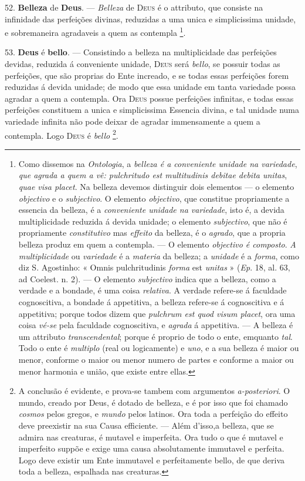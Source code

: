 52. \textbf{Belleza} de \textbf{Deus}. --- \emph{Belleza} de \textsc{Deus} é o attributo, que consiste na infinidade das perfeições divinas, reduzidas a uma unica e simplicissima unidade, e sobremaneira agradaveis a quem as contempla \footnote{Como dissemos na \emph{Ontologia}, a \emph{belleza é a conveniente unidade na variedade}, \emph{que agrada a quem a vê: pulchritudo est multitudinis debitae debita unitas}, \emph{quae visa placet}. Na belleza devemos distinguir dois elementos --- o elemento \emph{objectivo} e o \emph{subjectivo}. O elemento \emph{objectivo}, que constitue propriamente a essencia da belleza, é a \emph{conveniente unidade na variedade}, isto é, a devida multiplicidade reduzida á devida unidade; o elemento \emph{subjectivo}, que não é propriamente \emph{constitutivo} mas \emph{effeito} da belleza, é o \emph{agrado}, que a propria belleza produz em quem a contempla. --- O elemento \emph{objectivo é composto}. \emph{A multiplicidade} ou \emph{variedade} é a \emph{materia} da belleza; a \emph{unidade} é a \emph{forma}, como diz S. Agostinho: « Omnis pulchritudinis \emph{forma} est \emph{unitas} » (\emph{Ep}. 18, al. 63, ad Coelest. n. 2). --- O elemento \emph{subjectivo} indica que a belleza, como a verdade e a bondade, é uma coisa \emph{relativa}. A verdade refere-se á faculdade cognoscitiva, a bondade á appetitiva, a belleza refere-se á cognoscitiva e á appetitiva; porque todos dizem que \emph{pulchrum est quod visum placet}, ora uma coisa \emph{vé-se} pela faculdade cognoscitiva, e \emph{agrada} á appetitiva. --- A belleza é um attributo \emph{transcendental}; porque é proprio de todo o ente, emquanto \emph{tal}. Todo o ente é \emph{multiplo} (real ou logicamente) e \emph{uno}, e a sua belleza é maior ou menor, conforme o maior ou menor numero de partes e conforme a maior ou menor harmonia e união, que existe entre ellas.}.

53. \textbf{Deus} é \textbf{bello}. --- Consistindo a belleza na multiplicidade das perfeições devidas, reduzida á conveniente unidade, \textsc{Deus} será \emph{bello}, se possuir todas as perfeições, que são proprias do Ente increado, e se todas essas perfeições forem reduzidas á devida unidade; de modo que essa unidade em tanta variedade possa agradar a quem a contempla. Ora \textsc{Deus} possue perfeições infinitas, e todas essas perfeições constituem a unica e simplicissima Essencia divina, e tal unidade numa variedade infinita não pode deixar de agradar immensamente a quem a contempla. Logo \textsc{Deus} é \emph{bello} \footnote{A conclusão é evidente, e prova-se tambem com argumentos \emph{a-posteriori}. O mundo, creado por Deus, é dotado de belleza, e é por isso que foi chamado \emph{cosmos} pelos gregos, e \emph{mundo} pelos latinos. Ora toda a perfeição do effeito deve preexistir na sua Causa efficiente. --- Além d'isso,a belleza, que se admira nas creaturas, é mutavel e imperfeita. Ora tudo o que é mutavel e imperfeito suppõe e exige uma causa absolutamente immutavel e perfeita. Logo deve existir um Ente immutavel e perfeitamente bello, de que deriva toda a belleza, espalhada nas creaturas.}.

